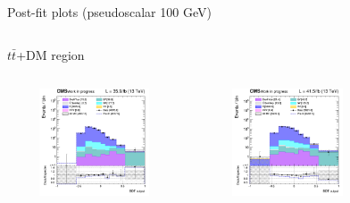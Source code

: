 \documentclass[8pt]{beamer}
\begin{document}
\begin{frame}{Post-fit plots (pseudoscalar 100 GeV)}
\vspace{-8pt}
\begin{columns}
\begin{column}{1.09\textwidth}
\begin{block}{\centering $t \bar t$+DM region}\end{block} \vspace{10pt}
\end{column}
\end{columns} \vspace{-16pt}
\begin{columns}
		\begin{column}{0.33\textwidth}
			\begin{center}
     			\includegraphics[width=1.0\textwidth, height=90pt]{figs/postfits/2016/log_cratio_TTbar_topCR_ll_BDT_ttDM100_TTbar_BDT_output_pseudoscalar100_customBinsAttempt7.png}
    		\end{center}		
		\end{column}
		\begin{column}{0.33\textwidth}
			\begin{center}
     			\includegraphics[width=1.0\textwidth, height=90pt]{figs/postfits/2017/log_cratio_TTbar_topCR_ll_BDT_ttDM100_TTbar_BDT_output_pseudoscalar100_customBinsAttempt7.png}
    		\end{center}		
		\end{column}
		\begin{column}{0.33\textwidth}
			\begin{center}

\end{center}
\end{column}
\end{columns}
\end{frame}
\end{document}
